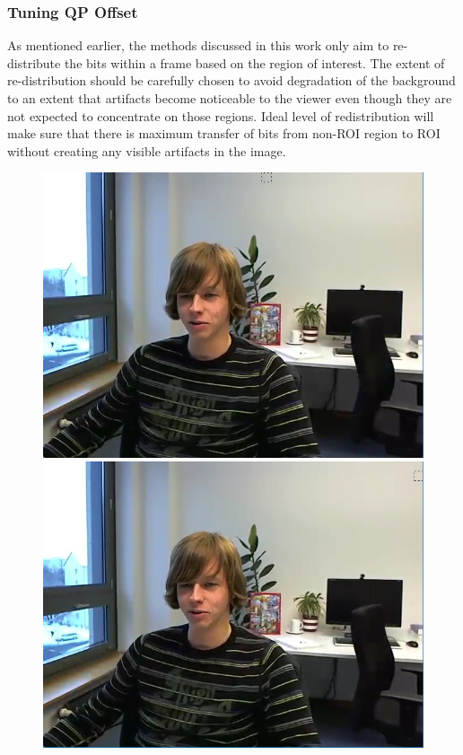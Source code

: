 \documentclass[11pt]{article} %
\begin{document}
\subsubsection{Tuning QP Offset}
As mentioned earlier, the methods discussed in this work only aim to re-distribute the bits within a frame based on the region of interest. The extent of re-distribution should be carefully chosen to avoid degradation of the background to an extent that artifacts become noticeable to the viewer even though they are not expected to concentrate on those regions. Ideal level of redistribution will make sure that there is maximum transfer of bits from non-ROI region to ROI without creating any visible artifacts in the image.
\begin{figure}[!h]
    \centering
    \includegraphics[scale=0.43]{QPOffset/trialOffset/Paul250kbps_offset2}
    \includegraphics[scale=0.43]{QPOffset/trialOffset/Paul250kbps_offset4}

\end{figure}
\end{document}
